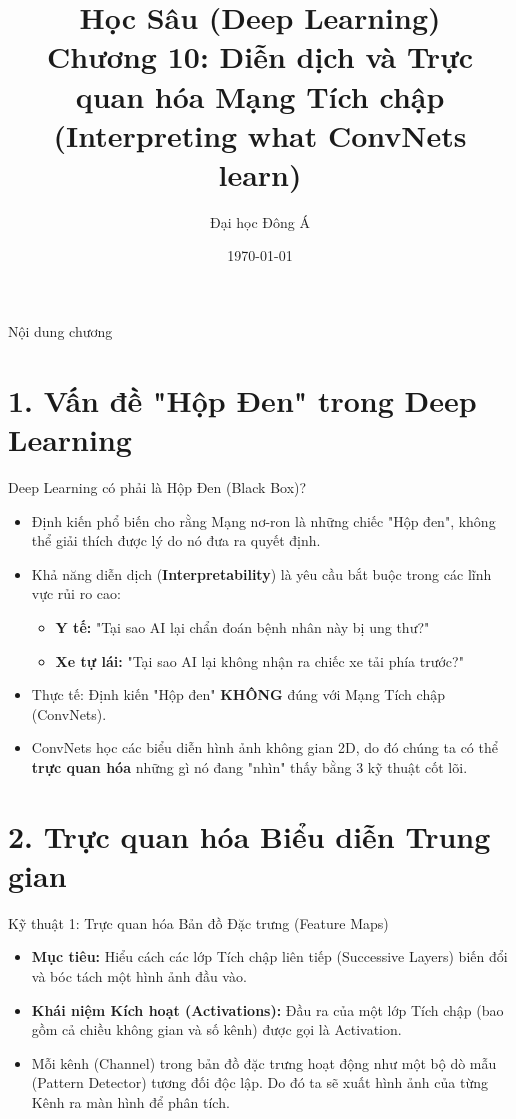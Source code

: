 \documentclass[aspectratio=169]{beamer}
\title[Chương 10: Trực quan hóa ConvNets]{Học Sâu (Deep Learning) \\ \vspace{0.5cm} \Large Chương 10: Diễn dịch và Trực quan hóa Mạng Tích chập \\ (Interpreting what ConvNets learn)}
\author{Đại học Đông Á}
\date{\today}
\begin{document}
\begin{frame}
    \titlepage
\end{frame}

\begin{frame}{Nội dung chương}
    \tableofcontents
\end{frame}

\section{1. Vấn đề "Hộp Đen" trong Deep Learning}

\begin{frame}{Deep Learning có phải là Hộp Đen (Black Box)?}
    \begin{itemize}
        \item Định kiến phổ biến cho rằng Mạng nơ-ron là những chiếc "Hộp đen", không thể giải thích được lý do nó đưa ra quyết định.
        \item Khả năng diễn dịch (\textbf{Interpretability}) là yêu cầu bắt buộc trong các lĩnh vực rủi ro cao:
        \begin{itemize}
            \item \textbf{Y tế:} "Tại sao AI lại chẩn đoán bệnh nhân này bị ung thư?"
            \item \textbf{Xe tự lái:} "Tại sao AI lại không nhận ra chiếc xe tải phía trước?"
        \end{itemize}
        \item Thực tế: Định kiến "Hộp đen" \textbf{KHÔNG} đúng với Mạng Tích chập (ConvNets).
        \item ConvNets học các biểu diễn hình ảnh không gian 2D, do đó chúng ta có thể \textbf{trực quan hóa} những gì nó đang "nhìn" thấy bằng 3 kỹ thuật cốt lõi.
    \end{itemize}
\end{frame}

\section{2. Trực quan hóa Biểu diễn Trung gian}

\begin{frame}{Kỹ thuật 1: Trực quan hóa Bản đồ Đặc trưng (Feature Maps)}
    \begin{itemize}
        \item \textbf{Mục tiêu:} Hiểu cách các lớp Tích chập liên tiếp (Successive Layers) biến đổi và bóc tách một hình ảnh đầu vào.
        \item \textbf{Khái niệm Kích hoạt (Activations):} Đầu ra của một lớp Tích chập (bao gồm cả chiều không gian và số kênh) được gọi là Activation.
        \item Mỗi kênh (Channel) trong bản đồ đặc trưng hoạt động như một bộ dò mẫu (Pattern Detector) tương đối độc lập. Do đó ta sẽ xuất hình ảnh của từng Kênh ra màn hình để phân tích.
    \end{itemize}
\end{frame}
\end{document}
